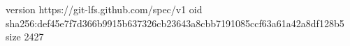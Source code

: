 version https://git-lfs.github.com/spec/v1
oid sha256:def45e7f7d366b9915b637326cb23643a8cbb7191085ccf63a61a42a8df128b5
size 2427
